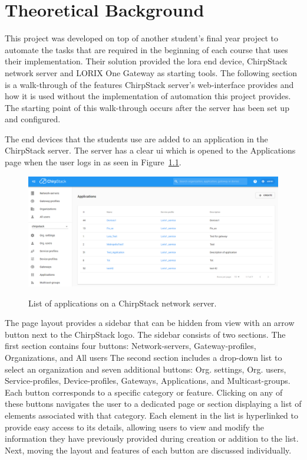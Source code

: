 
\chapter{Theoretical Background} \label{ch:theor_backgr}

This project was developed on top of another student's final year project \cite{theseus:gere-zoltan} to automate the tasks that are required in the beginning of each course that uses their implementation.
Their solution provided the \gls{lora} end device, ChirpStack network server and LORIX One Gateway as starting tools.
The following section is a walk-through of the features ChirpStack server's web-interface provides and how it is used without the implementation of automation this project provides.
The starting point of this walk-through occurs after the server has been set up and configured.

The end devices that the students use are added to an application in the ChirpStack server.
The server has a clear \gls{ui} which is opened to the Applications page when the user logs in as seen in Figure~\ref{fig:ChirpStack_application_list}.

\begin{figure}[ht]
  \centering
  {\includegraphics[width=\textwidth]{illustration/ChirpStack_application_list.png}}
  \caption{List of applications on a ChirpStack network server.}
  \label{fig:ChirpStack_application_list}
\end{figure}

The page layout provides a sidebar that can be hidden from view with an arrow button next to the ChirpStack logo.
The sidebar consists of two sections.
The first section contains four buttons: Network-servers, Gateway-profiles, Organizations, and All users
The second section includes a drop-down list to select an organization and seven additional buttons: Org. settings, Org. users, Service-profiles, Device-profiles, Gateways, Applications, and Multicast-groups.
Each button corresponds to a specific category or feature.
Clicking on any of these buttons navigates the user to a dedicated page or section displaying a list of elements associated with that category.
Each element in the list is hyperlinked to provide easy access to its details, allowing users to view and modify the information they have previously provided during creation or addition to the list.
Next, moving the layout and features of each button are discussed individually.

